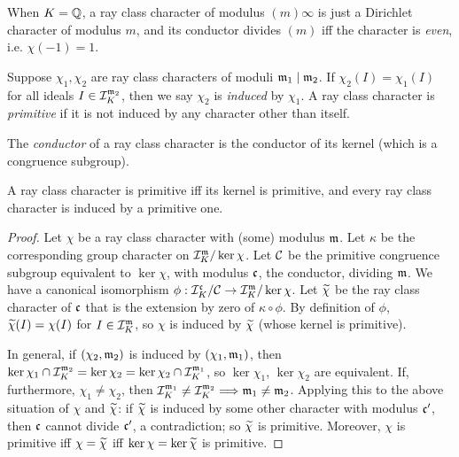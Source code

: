 \documentclass[11pt]{amsart}
\begin{document}
\begin{exm}
    When $K= \mathbb{Q}$, a ray class character of modulus $(m)\infty$ is just a Dirichlet character of modulus $m$, and its conductor divides $(m)$ iff the character is \emph{even}, i.e. $\chi(-1) = 1$.
\end{exm}

\begin{defn}
    Suppose $\chi_1,\chi_2$ are ray class characters of moduli $\mathfrak{m}_1\mid \mathfrak{m}_2$. If $\chi_2(I) = \chi_1(I)$ for all ideals $I\in \mathcal{I}_K^{\mathfrak{m}_2}$, then we say $\chi_2$ is \emph{induced} by $\chi_1$. A ray class character is \emph{primitive} if it is not induced by any character other than itself.
\end{defn}

\begin{defn}
    The \emph{conductor} of a ray class character is the conductor of its kernel (which is a congruence subgroup).
\end{defn}

\begin{prop}
    A ray class character is primitive iff its kernel is primitive, and every ray class character is induced by a primitive one.
\end{prop}

\begin{proof}
    Let $\chi$ be a ray class character with (some) modulus $\mathfrak{m}$. Let $\kappa$ be the corresponding group character on $\mathcal{I}_K^{\mathfrak{m}}/\ker\chi$. Let $\mathcal{C}$ be the primitive congruence subgroup equivalent to $\ker\chi$, with modulus $\mathfrak{c}$, the conductor, dividing $\mathfrak{m}$. We have a canonical isomorphism $\phi: \mathcal{I}_K^{\mathfrak{c}}/\mathcal{C} \to \mathcal{I}_K^{\mathfrak{m}}/\ker\chi$. Let $\widetilde{\chi}$ be the ray class character of $\mathfrak{c}$ that is the extension by zero of $\kappa\circ \phi$. By definition of $\phi$, $\widetilde{\chi}(I) = \chi(I)$ for $I\in \mathcal{I}_K^{\mathfrak{m}}$, so $\chi$ is induced by $\widetilde{\chi}$ (whose kernel is primitive).

    In general, if $(\chi_2,\mathfrak{m}_2)$ is induced by $(\chi_1,\mathfrak{m}_1)$, then $\ker\chi_1\cap \mathcal{I}_K^{\mathfrak{m}_2} = \ker\chi_2 = \ker\chi_2\cap \mathcal{I}_K^{\mathfrak{m}_1}$, so $\ker\chi_1$, $\ker\chi_2$ are equivalent. If, furthermore, $\chi_1\neq\chi_2$, then $\mathcal{I}_K^{\mathfrak{m}_1}\neq \mathcal{I}_K^{\mathfrak{m}_2} \Longrightarrow \mathfrak{m}_1\neq \mathfrak{m}_2$. Applying this to the above situation of $\chi$ and $\widetilde{\chi}$: if $\widetilde{\chi}$ is induced by some other character with modulus $\mathfrak{c}'$, then $\mathfrak{c}$ cannot divide $\mathfrak{c}'$, a contradiction; so $\widetilde{\chi}$ is primitive. Moreover, $\chi$ is primitive iff $\chi = \widetilde{\chi}$ iff $\ker\chi = \ker\widetilde{\chi}$ is primitive.
\end{proof}
\end{document}
